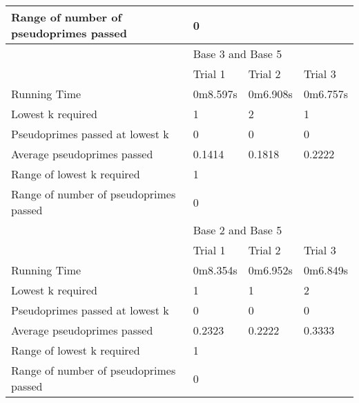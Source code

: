 \documentclass{article}
\begin{document}
\begin{appendices}
\begin{longtable}{llll}
Range of number of pseudoprimes passed & \multicolumn{3}{l}{0}                  \\
\midrule
                                       & \multicolumn{3}{l}{Base 3 and Base 5}  \\
\midrule
                                       & Trial 1  & Trial 2  & Trial 3          \\
Running Time                           & 0m8.597s & 0m6.908s & 0m6.757s         \\
Lowest k required                      & 1        & 2        & 1                \\
Pseudoprimes passed at lowest k        & 0        & 0        & 0                \\
Average pseudoprimes passed            & 0.1414   & 0.1818   & 0.2222           \\
\cmidrule(lr){2-4}
Range of lowest k required             & \multicolumn{3}{l}{1}                  \\
Range of number of pseudoprimes passed & \multicolumn{3}{l}{0}                  \\
\midrule
                                       & \multicolumn{3}{l}{Base 2 and Base 5}  \\
\midrule
                                       & Trial 1  & Trial 2  & Trial 3          \\
Running Time                           & 0m8.354s & 0m6.952s & 0m6.849s         \\
Lowest k required                      & 1        & 1        & 2                \\
Pseudoprimes passed at lowest k        & 0        & 0        & 0                \\
Average pseudoprimes passed            & 0.2323   & 0.2222   & 0.3333           \\
\cmidrule(lr){2-4}
Range of lowest k required             & \multicolumn{3}{l}{1}                  \\
Range of number of pseudoprimes passed & \multicolumn{3}{l}{0}                  \\
\bottomrule
\end{longtable}
\FloatBarrier


\end{appendices}
\end{document}
